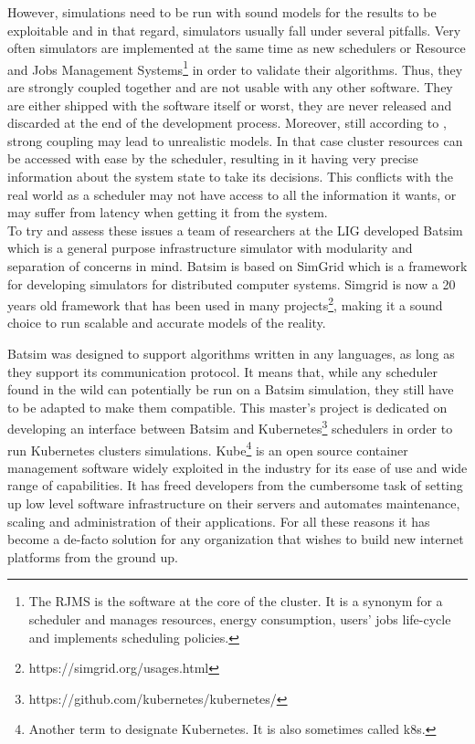 \documentclass[12pt, a4paper]{memoir}
\begin{document}
However, simulations need to be run with sound models for the results to be
exploitable and in that regard, simulators usually fall under several
pitfalls\cite{poquet:tel-01757245}. Very often simulators are implemented at
the same time as new schedulers or Resource and Jobs Management
Systems\footnote{The RJMS is the software at the core of the cluster. It is a
synonym for a scheduler and manages resources, energy consumption, users' jobs
life-cycle and implements scheduling policies.} in order to validate their
algorithms. Thus, they are strongly coupled together and are not usable with
any other software. They are either shipped with the software itself or worst,
they are never released and discarded at the end of the development process.
Moreover, still according to \cite{poquet:tel-01757245}, strong coupling may
lead to unrealistic models. In that case cluster resources can be accessed with
ease by the scheduler, resulting in it having very precise information about the
system state to take its decisions.  This conflicts with the real world as a
scheduler may not have access to all the information it wants, or may suffer
from latency when getting it from the system.\\

To try and assess these issues a team of researchers at the LIG developed
Batsim\cite{dutot:hal-01333471} which is a general purpose infrastructure
simulator with modularity and separation of concerns in mind. Batsim is based
on SimGrid\cite{casanova:hal-01017319} which is a framework for developing
simulators for distributed computer systems. Simgrid is now a 20 years old
framework that has been used in many
projects\footnote{https://simgrid.org/usages.html}, making it a sound choice to
run scalable and accurate models of the reality.

Batsim was designed to support algorithms written in any languages, as long as
they support its communication protocol. It means that, while any scheduler
found in the wild can potentially be run on a Batsim simulation, they still
have to be adapted to make them compatible. This master's project is dedicated
on developing an interface between Batsim and
Kubernetes\footnote{https://github.com/kubernetes/kubernetes/} schedulers in
order to run Kubernetes clusters simulations. Kube\footnote{Another term to
designate Kubernetes. It is also sometimes called k8s.} is an open source
container management software widely exploited in the industry for its ease of
use and wide range of capabilities. It has freed developers from the cumbersome
task of setting up low level software infrastructure on their servers and
automates maintenance, scaling and administration of their applications. For
all these reasons it has become a de-facto solution for any organization that
wishes to build new internet platforms from the ground up.\\
\end{document}
